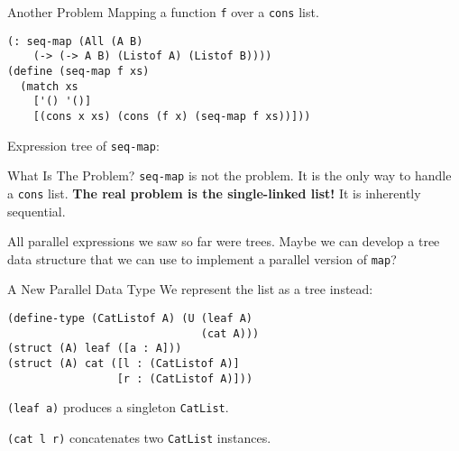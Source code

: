 \documentclass{beamer}
\begin{document}
\begin{frame}[fragile]{Another Problem}
Mapping a function \lstinline{f} over a \lstinline{cons} list.

\begin{lstlisting}
(: seq-map (All (A B)
    (-> (-> A B) (Listof A) (Listof B))))
(define (seq-map f xs)
  (match xs
    ['() '()]
    [(cons x xs) (cons (f x) (seq-map f xs))]))
\end{lstlisting}

\pause{} \vspace{.5cm}

Expression tree of \lstinline{seq-map}:

  \begin{center}
  \end{center}
\end{frame}

\begin{frame}{What Is The Problem?}
  \lstinline{seq-map} is not the problem. It is the only way to handle a \lstinline{cons} list. \textbf{The real problem is the single-linked list!} It is inherently sequential.

\pause{} \vspace{1cm}

All parallel expressions we saw so far were trees. Maybe we can develop a tree data structure that we can use to implement a parallel version of \lstinline{map}?
\end{frame}

\begin{frame}[fragile]{A New Parallel Data Type}
We represent the list as a tree instead:
\begin{lstlisting}
(define-type (CatListof A) (U (leaf A)
                              (cat A)))
(struct (A) leaf ([a : A]))
(struct (A) cat ([l : (CatListof A)]
                 [r : (CatListof A)]))
\end{lstlisting}

\pause{} \vspace{.5cm}

\lstinline{(leaf a)} produces a singleton \lstinline{CatList}.

\lstinline{(cat l r)} concatenates two \lstinline{CatList} instances.
\end{frame}
\end{document}
